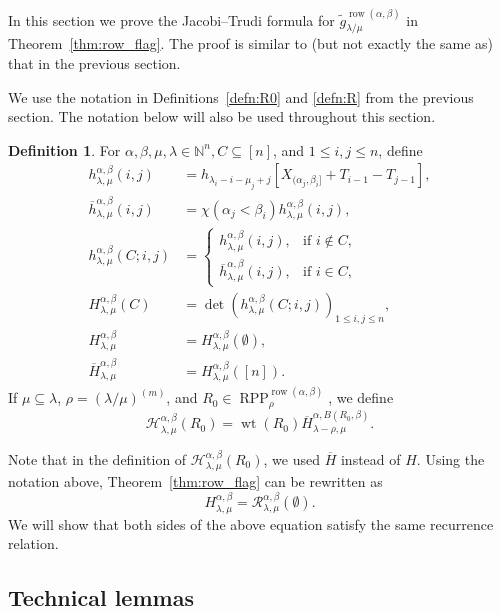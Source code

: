 \documentclass[12pt]{amsart}
\numberwithin{equation}{section}
\theoremstyle{definition}
\newtheorem{defn}[thm]{Definition}
\newcommand\wg{\widetilde{g}}
\newcommand\ovh{\overline{h}}
\newcommand\ovH{\overline{H}}
\newcommand\row{\operatorname{row}}
\newcommand\NN{\mathbb{N}}
\newcommand\RPP{\operatorname{RPP}}
\newcommand\lm{{\lambda/\mu}}
\newcommand\wt{\operatorname{wt}}
\newcommand\R{\mathcal{R}}
\newcommand\HH{\mathcal{H}}
\begin{document}
In this section we prove the Jacobi--Trudi formula for
$\wg_{\lambda/\mu}^{\row(\alpha,\beta)}$ in Theorem~\ref{thm:row_flag}. The
proof is similar to (but not exactly the same as) that in the previous section.

We use the notation in Definitions~\ref{defn:R0} and \ref{defn:R} from the
previous section. The notation below will also be used throughout this section.


\begin{defn}\label{defn:H}
For $\alpha,\beta,\mu,\lambda\in\NN^n,C\subseteq[n]$, and $1\le i,j\le n$,
define
\begin{align*}
  h_{\lambda,\mu}^{\alpha,\beta}(i,j) &=
  h_{\lambda_i-i-\mu_j+j}[X_{(\alpha_j,\beta_i]}+T_{i-1}-T_{j-1}],\\
  \ovh_{\lambda,\mu}^{\alpha,\beta}(i,j)
  &= \chi(\alpha_j<\beta_i) h_{\lambda,\mu}^{\alpha,\beta}(i,j),\\
  h_{\lambda,\mu}^{\alpha,\beta}(C;i,j)
  &= \begin{cases}
      h_{\lambda,\mu}^{\alpha,\beta}(i,j), & \mbox{if $i\not\in C$},\\
      \ovh_{\lambda,\mu}^{\alpha,\beta}(i,j), & \mbox{if $i\in C$},
    \end{cases}\\
  H_{\lambda,\mu}^{\alpha,\beta}(C)
  &= \det \left(h_{\lambda,\mu}^{\alpha,\beta}(C;i,j) \right)_{1\le i,j\le n},\\
  H_{\lambda,\mu}^{\alpha,\beta}
  &= H_{\lambda,\mu}^{\alpha,\beta}(\emptyset),\\
  \ovH_{\lambda,\mu}^{\alpha,\beta}
  &= H_{\lambda,\mu}^{\alpha,\beta}([n]).
\end{align*}
If $\mu\subseteq\lambda$, $\rho=(\lm)^{(m)}$, and
$R_0\in\RPP^{\row(\alpha,\beta)}_\rho$, we define
\begin{equation}
  \label{eq:defHH}
  \HH_{\lambda,\mu}^{\alpha,\beta}(R_0) = \wt(R_0)
  \ovH_{\lambda-\rho,\mu}^{\alpha,B(R_0,\beta)}.
\end{equation}
\end{defn}

Note that in the definition of $\HH_{\lambda,\mu}^{\alpha,\beta}(R_0)$, we used
$\ovH$ instead of $H$. Using the notation above, Theorem~\ref{thm:row_flag} can
be rewritten as
\[
H_{\lambda,\mu}^{\alpha,\beta} = \R_{\lambda,\mu}^{\alpha,\beta}(\emptyset).
\]
We will show that both sides of the above equation satisfy the same
recurrence relation.



\subsection{Technical lemmas}
\label{sec:technical-lemmas-1}
\end{document}
